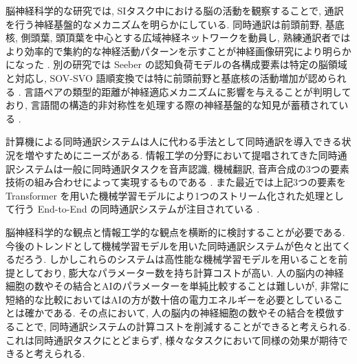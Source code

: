 脳神経科学的な研究では, SIタスク中における脳の活動を観察することで, 通訳を行う神経基盤的なメカニズムを明らかにしている.
同時通訳は前頭前野, 基底核, 側頭葉, 頭頂葉を中心とする広域神経ネットワークを動員し, 熟練通訳者ではより効率的で集約的な神経活動パターンを示すことが神経画像研究により明らかになった \cite{hervais2015fmri, vandeputte2018anatomical} .
別の研究では Seeber の認知負荷モデルの各構成要素は特定の脳領域と対応し, SOV-SVO 語順変換では特に前頭前野と基底核の活動増加が認められる \cite{yagura2021selective} .
言語ペアの類型的距離が神経適応メカニズムに影響を与えることが判明しており, 言語間の構造的非対称性を処理する際の神経基盤的な知見が蓄積されている \cite{lin2018costly, ishizuka2024two} .

計算機による同時通訳システムは人に代わる手法として同時通訳を導入できる状況を増やすためにニーズがある.
情報工学の分野において提唱されてきた同時通訳システムは一般に同時通訳タスクを音声認識, 機械翻訳, 音声合成の3つの要素技術の組み合わせによって実現するものである \cite{doi2024evaluation} .
また最近では上記3つの要素を Transformer \cite{vaswani2017attention} を用いた機械学習モデルにより1つのストリーム化された処理として行う End-to-End の同時通訳システムが注目されている \cite{liu2024recent, ma2024nast, zhang2024streamspeech} .

脳神経科学的な観点と情報工学的な観点を横断的に検討することが必要である.
今後のトレンドとして機械学習モデルを用いた同時通訳システムが色々と出てくるだろう.
しかしこれらのシステムは高性能な機械学習モデルを用いることを前提としており, 膨大なパラメーター数を持ち計算コストが高い.
人の脳内の神経細胞の数やその結合とAIのパラメーターを単純比較することは難しいが, 非常に短絡的な比較においてはAIの方が数十倍の電力エネルギーを必要としていることは確かである.
その点において, 人の脳内の神経細胞の数やその結合を模倣することで, 同時通訳システムの計算コストを削減することができると考えられる.
これは同時通訳タスクにとどまらず, 様々なタスクにおいて同様の効果が期待できると考えられる.